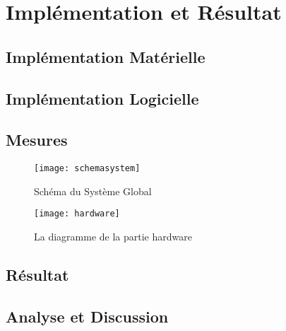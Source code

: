 \chapter{Implémentation et Résultat}

\section{Implémentation Matérielle}

\section{Implémentation Logicielle}

\section{Mesures}

\begin{figure}[h]
	\label{fig:system}
	\centering
	\texttt{[image: schemasystem]}
	\caption{Schéma du Système Global \cite{Brisebard2015}}
	\vspace{-2mm}
\end{figure}

\begin{figure}[h]
	\label{fig:hardware}
	\centering
	\texttt{[image: hardware]}
	\caption{La diagramme de la partie hardware}
	\vspace{-2mm}
\end{figure}

\section{Résultat}

\blindtext

\section{Analyse et Discussion}